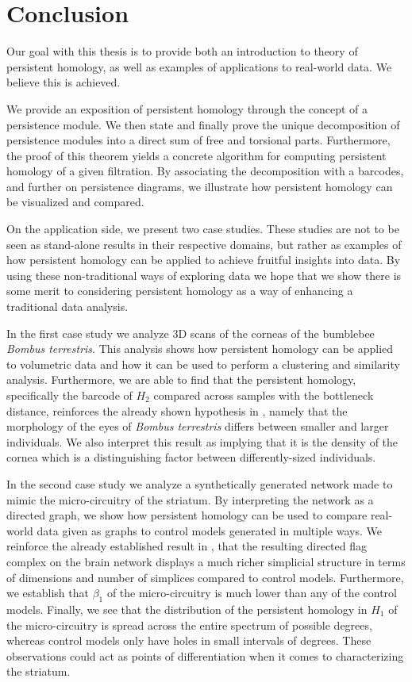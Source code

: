 \clearpage
\chapter{Conclusion}


Our goal with this thesis is to provide both an introduction to theory of persistent homology, as well as examples of applications to real-world data. We believe this is  achieved.

We provide an exposition of persistent homology through the concept of a persistence module. We then state and finally prove the unique decomposition of persistence modules into a direct sum of free and torsional parts.  Furthermore, the proof of this theorem yields a concrete algorithm for computing persistent homology of a given filtration. By associating the decomposition with a barcodes, and further on persistence diagrams, we illustrate how persistent homology can be visualized and compared.

On the application side, we present two case studies. These studies are not to be seen as stand-alone results in their respective domains, but rather as examples of how persistent homology can be applied to achieve fruitful insights into data. By using these non-traditional ways of exploring data we hope that we show there is some merit to considering persistent homology as a way of enhancing a traditional data analysis.

In the first case study we analyze 3D scans of the corneas of the bumblebee \textit{Bombus terrestris}. This analysis shows how persistent homology can be applied to volumetric data and how it can be used to perform a clustering and similarity analysis. Furthermore, we are able to find that the persistent homology, specifically the barcode of $H_{2}$ compared across samples with the bottleneck distance, reinforces the already shown hypothesis in \cite{emily}, namely that the morphology of the eyes of \textit{Bombus terrestris} differs between smaller and larger individuals. We also interpret this result as implying that it is the density of the cornea which is a distinguishing factor between differently-sized individuals.

In the second case study we analyze a synthetically generated network made to mimic the micro-circuitry of the striatum. By interpreting the network as a directed graph, we show how persistent homology can be used to compare real-world data given as graphs to control models generated in multiple ways. We reinforce the already established result in \cite{reimann}, that the resulting directed flag complex on the brain network displays a much richer simplicial structure in terms of dimensions and number of simplices compared to control models. Furthermore, we establish that $\beta_{1}$ of the micro-circuitry is much lower than any of the control models. Finally, we see that the distribution of the persistent homology in $H_{1}$ of the micro-circuitry is spread across the entire spectrum of possible degrees, whereas control models only have holes in small intervals of degrees. These observations could act as points of differentiation when it comes to characterizing the striatum.

